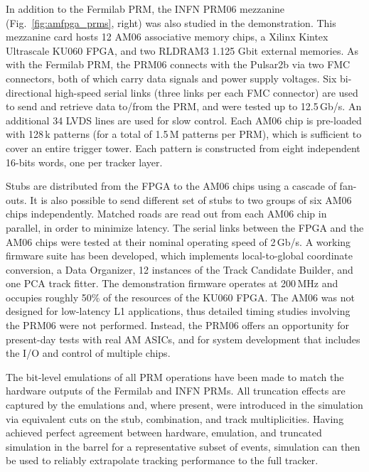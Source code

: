 In addition to the Fermilab PRM, the INFN PRM06 mezzanine (Fig.~\ref{fig:amfpga_prms}, right) was also studied in the demonstration. This mezzanine card hosts 12 AM06 associative memory chips, a Xilinx Kintex Ultrascale KU060 FPGA, and two RLDRAM3 1.125 Gbit external memories. As with the Fermilab PRM, the PRM06 connects with the Pulsar2b via two FMC connectors, both of which carry data signals and power supply voltages. Six bi-directional high-speed serial links (three links per each FMC connector) are used to send and retrieve data to/from the PRM, and were tested up to 12.5\,Gb/s. An additional 34 LVDS lines are used for slow control. Each AM06 chip is pre-loaded with 128\,k patterns (for a total of 1.5\,M patterns per PRM), which is sufficient to cover an entire trigger tower. Each pattern is constructed from eight independent 16-bits words, one per tracker layer.  

Stubs are distributed from the FPGA to the AM06 chips using a cascade of fan-outs. It is also possible to send different set of stubs to two groups of six AM06 chips independently. Matched roads are read out from each AM06 chip in parallel, in order to minimize latency. The serial links between the FPGA and the AM06 chips were tested at their nominal operating speed of 2\,Gb/s. A working firmware suite has been developed, which implements local-to-global coordinate conversion, a Data Organizer, 12 instances of the Track Candidate Builder, and one PCA track fitter. The demonstration firmware operates at 200\,MHz and occupies roughly 50\% of the resources of the KU060 FPGA. The AM06 was not designed for low-latency L1 applications, thus detailed timing studies involving the PRM06 were not performed. Instead, the PRM06 offers an opportunity for present-day tests with real AM ASICs, and for system development that includes the I/O and control of multiple chips.  

The bit-level emulations of all PRM operations have been made to match the hardware outputs of the Fermilab and INFN PRMs. All truncation effects are captured by the emulations and, where present, were introduced in the simulation via equivalent cuts on the stub, combination, and track multiplicities. Having achieved perfect agreement between hardware, emulation, and truncated simulation in the barrel for a representative subset of events, simulation can then be used to reliably extrapolate tracking performance to the full tracker.


